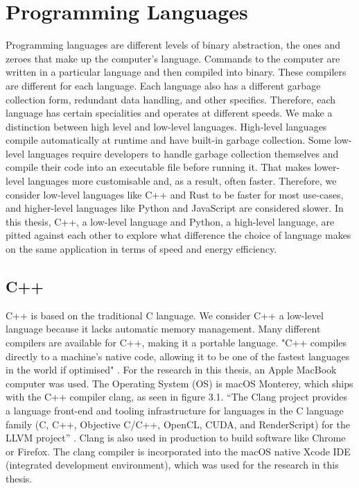 \chapter{Programming Languages}

Programming languages are different levels of binary abstraction, the ones and zeroes that make up the computer's language. Commands to the computer are written in a particular language and then compiled into binary.
These compilers are different for each language. Each language also has a different garbage collection form, redundant data handling, and other specifics. Therefore, each language has certain specialities and operates at different speeds.
We make a distinction between high level and low-level languages. High-level languages compile automatically at runtime and have built-in garbage collection. Some low-level languages require developers to handle garbage collection themselves and compile their code into an executable file before running it.
That makes lower-level languages more customisable and, as a result, often faster.
Therefore, we consider low-level languages like C++ and Rust to be faster for most use-cases, and higher-level languages like Python and JavaScript are considered slower.
In this thesis, C++, a low-level language and Python, a high-level language, are pitted against each other to explore what difference the choice of language makes on the same application in terms of speed and energy efficiency.

\section{C++}
C++ is based on the traditional C language. We consider C++ a low-level language because it lacks automatic memory management. Many different compilers are available for C++, making it a portable language. "C++ compiles directly to a machine's native code, allowing it to be one of the fastest languages in the world if optimised" \cite{C++}.
For the research in this thesis, an Apple MacBook computer was used. The Operating System (OS) is macOS Monterey, which ships with the C++ compiler clang, as seen in figure 3.1. “The Clang project provides a language front-end and tooling infrastructure for languages in the C language family (C, C++, Objective C/C++, OpenCL, CUDA, and RenderScript) for the LLVM project” \cite{clang}. Clang is also used in production to build software like Chrome or Firefox. The clang compiler is incorporated into the macOS native Xcode IDE (integrated development environment), which was used for the research in this thesis.

